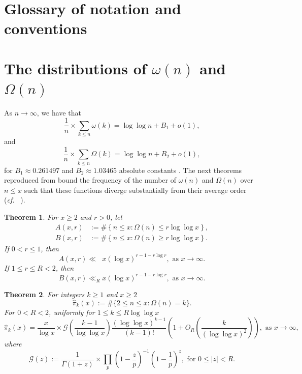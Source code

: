 \documentclass[11pt,reqno,a4letter]{article}
\numberwithin{equation}{section}
\numberwithin{figure}{section}
\numberwithin{table}{section}
\newcommand{\cf}{\textit{cf.\ }}
\theoremstyle{plain}
\newtheorem{theorem}{Theorem}
\numberwithin{theorem}{section}
\theoremstyle{definition}
\begin{document}
\section{Glossary of notation and conventions}
\label{Section_NotationAndConventions}

\renewcommand*{\glsclearpage}{}
\renewcommand{\glossarysection}[2][]{}
\printglossary[type={symbols},
               style={glossstyleSymbol},
               nogroupskip=true]

\section{The distributions of $\omega(n)$ and $\Omega(n)$} 
\label{subSection_TheKnownDistsOfThePrimeOmegaFunctions_IntroResults_v1} 

As $n \rightarrow \infty$, we have that 
$$\frac{1}{n} \times \sum_{k \leq n} \omega(k) = \log\log n + B_1 + o(1),$$ 
and 
$$\frac{1}{n} \times \sum_{k \leq n} \Omega(k) = \log\log n + B_2 + o(1),$$ for 
$B_1 \approx 0.261497$ and $B_2 \approx 1.03465$ 
absolute constants \cite[\S 22.10]{HARDYWRIGHT}. 
The next theorems reproduced from \cite[\S 7.4]{MV} bound the frequency of the 
number of $\omega(n)$ and $\Omega(n)$ over $n \leq x$ such that 
these functions diverge substantially from their average order 
(\cf \cite{ERDOS-KAC-REF,BILLINGSLY-CLT-PRIMEDIVFUNC} \cite[\S 7.4]{MV}). 

\begin{theorem} 
\label{theorem_MV_Thm7.20-init_stmt} 
For $x \geq 2$ and $r > 0$, let 
\begin{align*} 
A(x, r) & := \#\left\{n \leq x: \Omega(n) \leq r \log\log x\right\}, \\ 
B(x, r) & := \#\left\{n \leq x: \Omega(n) \geq r \log\log x\right\}. 
\end{align*} 
If $0 < r \leq 1$, then 
\[
A(x, r) \ll\phantom{_R} x (\log x)^{r-1 - r\log r}, \text{ as } x \rightarrow \infty. 
\]
If $1 \leq r \leq R < 2$, then 
\[
B(x, r) \ll_R x (\log x)^{r-1-r \log r}, \text{ as } x \rightarrow \infty. 
\]
\end{theorem} 

\begin{theorem}
\label{theorem_HatPi_ExtInTermsOfGz} 
For integers $k \geq 1$ and $x \geq 2$ 
$$\widehat{\pi}_k(x) := \#\{2 \leq n \leq x: \Omega(n)=k\}.$$ 
For $0 < R < 2$, uniformly for $1 \leq k \leq R \log\log x$ 
\[
\widehat{\pi}_k(x) = \frac{x}{\log x} \times \mathcal{G}\left(\frac{k-1}{\log\log x}\right) 
     \frac{(\log\log x)^{k-1}}{(k-1)!} \left(1 + O_R\left(\frac{k}{(\log\log x)^2}\right)\right), 
     \text{ as } x \rightarrow \infty, 
\]
where 
\[
\mathcal{G}(z) := \frac{1}{\Gamma(1+z)} \times 
	\prod_p \left(1-\frac{z}{p}\right)^{-1} \left(1-\frac{1}{p}\right)^z, 
	\text{ for } 0 \leq |z| < R. 
\]
\end{theorem} 
\end{document}
